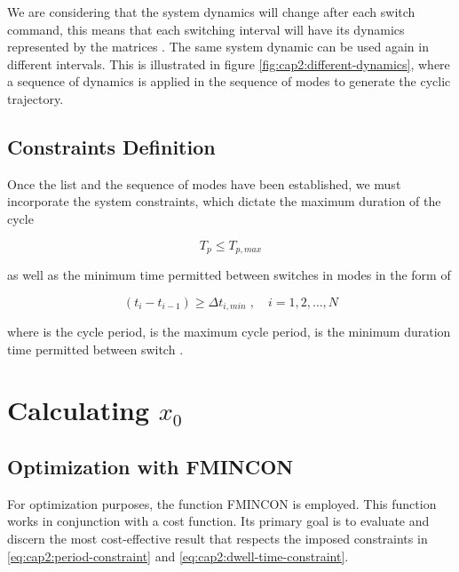     We are considering that the system dynamics will change after each switch command, this means that each 
    switching interval will have its dynamics represented by the matrices . The same system 
    dynamic can be used again in different intervals. This is illustrated in figure \ref{fig:cap2:different-dynamics},
    where a sequence of dynamics is applied in the sequence of modes \highlight{$\big[4,2,1,2,3\big]$} to generate the cyclic trajectory.

\subsection{Constraints Definition}

    Once the list and the sequence of modes have been established, we must incorporate 
    the system constraints, which dictate the maximum duration of the cycle
    
    \noindent
    \begin{equation}
        \label{eq:cap2:period-constraint}
        T_p \le T_{p,max}
    \end{equation}
    
    \noindent
    as well as the minimum time permitted between switches in modes in the form of

    \noindent
    \begin{equation}
        \label{eq:cap2:dwell-time-constraint}
        (t_i - t_{i - 1}) \ge \Delta t_{i,min}\;, \quad i = 1,2,\dotso,N
    \end{equation}

    \noindent
    where  is the cycle period,  is the maximum cycle period,
     is the minimum duration time permitted between switch .

\section{Calculating \texorpdfstring{$x_0$}{x\_0}}

    

\subsection{Optimization with FMINCON}

    For optimization purposes, the function FMINCON is employed. This function works 
    in conjunction with a cost function. Its primary goal is to evaluate and 
    discern the most cost-effective result that respects the imposed constraints in \eqref{eq:cap2:period-constraint} and 
    \eqref{eq:cap2:dwell-time-constraint}.
    
